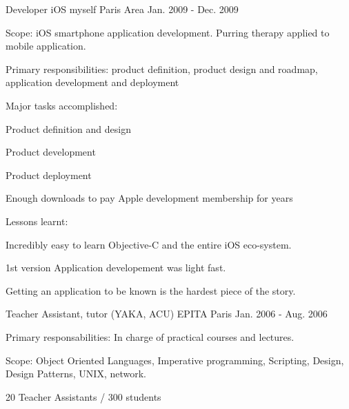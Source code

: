 \begin{cventries}
  \cventry
    {Developer iOS} %
    {myself} %
    {Paris Area} %
    {Jan. 2009 - Dec. 2009} %
    {
      \begin{cvitems} %
        \item {Scope: iOS smartphone application development. Purring therapy applied to mobile application.}
        \item {Primary responsibilities: product definition, product design and roadmap, application development and deployment}
        \item {Major tasks accomplished:}
        \begin{cvsubitems}
          \item {Product definition and design}
          \item {Product development}
          \item {Product deployment}
          \item {Enough downloads to pay Apple development membership for years}
        \end{cvsubitems}
        \item {Lessons learnt:}
        \begin{cvsubitems}
          \item {Incredibly easy to learn Objective-C and the entire iOS eco-system.}
          \item {1st version Application developement was light fast.}
          \item {Getting an application to be known is the hardest piece of the story.}
        \end{cvsubitems}
      \end{cvitems}
    }

  \cventry
    {Teacher Assistant, tutor (YAKA, ACU)} %
    {EPITA} %
    {Paris} %
    {Jan. 2006 - Aug. 2006} %
    {
      \begin{cvitems} %
        \item {Primary responsabilities: In charge of practical courses and lectures.}
        \item {Scope: Object Oriented Languages, Imperative programming, Scripting, Design, Design Patterns, UNIX, network.}
        \item {20 Teacher Assistants / 300 students}
      \end{cvitems}
    }


\end{cventries}
